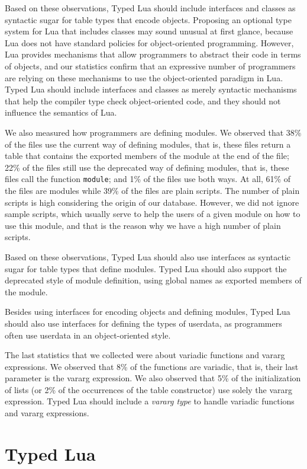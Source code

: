 Based on these observations, Typed Lua should include interfaces and
classes as syntactic sugar for table types that encode objects.
Proposing an optional type system for Lua that includes classes may
sound unusual at first glance, because Lua does not have standard
policies for object-oriented programming.
However, Lua provides mechanisms that allow programmers to abstract
their code in terms of objects, and our statistics confirm that
an expressive number of programmers are relying on these mechanisms to
use the object-oriented paradigm in Lua.
Typed Lua should include interfaces and classes as merely syntactic
mechanisms that help the compiler type check object-oriented code,
and they should not influence the semantics of Lua.

We also measured how programmers are defining modules.
We observed that 38\% of the files use the current way of defining
modules, that is, these files return a table that contains the
exported members of the module at the end of the file;
22\% of the files still use the deprecated way of defining modules,
that is, these files call the function \texttt{module};
and 1\% of the files use both ways.
At all, 61\% of the files are modules while 39\% of the files are
plain scripts.
The number of plain scripts is high considering the origin of
our database.
However, we did not ignore sample scripts, which usually serve to
help the users of a given module on how to use this module, and
that is the reason why we have a high number of plain scripts.

Based on these observations, Typed Lua should also use interfaces as
syntactic sugar for table types that define modules.
Typed Lua should also support the deprecated style of module
definition, using global names as exported members of the module.

Besides using interfaces for encoding objects and defining modules,
Typed Lua should also use interfaces for defining the types of
userdata, as programmers often use userdata in an object-oriented
style.

The last statistics that we collected were about variadic functions
and vararg expressions.
We observed that 8\% of the functions are variadic, that is,
their last parameter is the vararg expression.
We also observed that 5\% of the initialization of lists
(or 2\% of the occurrences of the table constructor) use solely the
vararg expression.
Typed Lua should include a \emph{vararg type} to handle variadic
functions and vararg expressions.

\section{Typed Lua}

